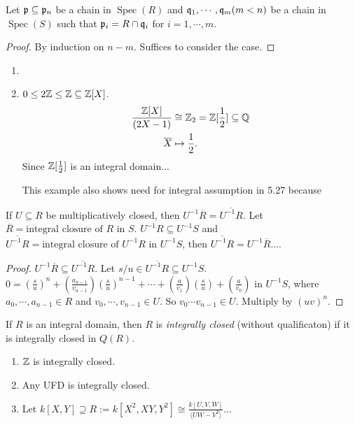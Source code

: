 \begin{theorem}[Going up]
    Let $\mathfrak{p} \subseteq \mathfrak{p}_n$ be a chain in $\operatorname{Spec}(R)$ and $\mathfrak{q}_1,\cdots,\mathfrak{q}_m(m < n)$ be a chain in $\operatorname{Spec}(S)$ such that $\mathfrak{p}_i = R \cap \mathfrak{q}_i$ for $i = 1,\cdots,m$.
\end{theorem}

\begin{proof}
    By induction on $n-m$. Suffices to consider the case.
\end{proof}

\begin{example}
    \begin{enumerate}
        \item 
        \item $0 \leq 2\mathbb{Z} \leq \mathbb{Z} \subseteq \mathbb{Z}[X]$. 
            \begin{align*}
                \frac{\bbZ[X]}{(2X-1)} &\cong \bbZ_2 = \bbZ[\frac{1}{2}] \subseteq \bbQ \\
                \overbar{X} &\mapsto \frac{1}{2}.
            \end{align*}
            Since $\mathbb{Z}[\frac{1}{2}]$ is an integral domain... \par 
            This example also shows need for integral assumption in 5.27 because 
    \end{enumerate}
\end{example}

\begin{proposition}
    If $U \subseteq R$ be multiplicatively closed, then $U^{-1} \overbar{R} = \overbar{U^{-1}R}$. Let $\overbar{R} = \text{integral closure of $R$ in $S$}$. $U^{-1}R \subseteq U^{-1}S$ and $\overbar{U^{-1}R} = \text{integral closure of $U^{-1}R$ in $U^{-1}S$}$, then $\overbar{U^{-1}R} = U^{-1} \overbar{R}$....
\end{proposition}

\begin{proof}
    $U^{-1} \overbar{R} \subseteq \overbar{U^{-1}R}$. Let $s/u \in \overbar{U^{-1}R} \subseteq U^{-1}S$. $0 = (\frac{s}{u})^{n} + (\frac{a_{n-1}}{v_{n-1}})(\frac{s}{u})^{n-1} + \cdots + (\frac{a}{v_1})(\frac{s}{u}) + (\frac{a}{v_0})$ in $U^{-1}S$, where $a_0,\cdots,a_{n-1} \in R$ and $v_0,\cdots,v_{n-1} \in U$. So $v_0 \cdots v_{n-1} \in U$. Multiply by $(uv)^{n}$.
\end{proof}

\begin{definition}
    If $R$ is an integral domain, then $R$ is \emph{integrally closed} (without qualificaton) if it is integrally closed in $Q(R)$. 
\end{definition}

\begin{example}
    \begin{enumerate}
        \item $\mathbb{Z}$ is integrally closed.
        \item Any UFD is integrally closed.
        \item Let $k[X,Y] \supseteq R := k[X^{2},XY,Y^{2}] \cong \frac{k[U,V,W]}{\langle UW-V^{2} \rangle}$...
    \end{enumerate}
\end{example}
